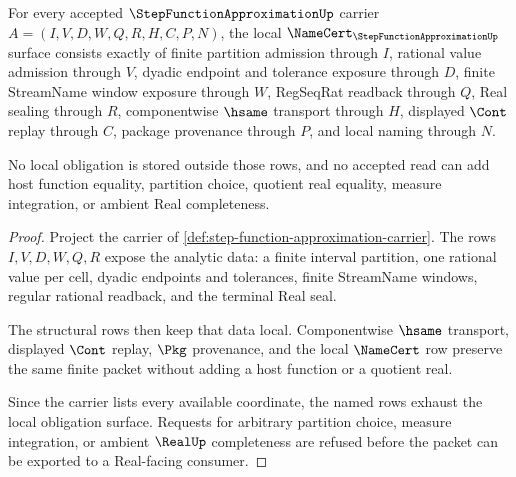 \begin{theorem}
\label{thm:step-function-approximation-namecert-obligations}
For every accepted $\StepFunctionApproximationUp$ carrier $A=(I,V,D,W,Q,R,H,C,P,N)$, the local $\NameCert_{\StepFunctionApproximationUp}$ surface consists exactly of finite partition admission through $I$, rational value admission through $V$, dyadic endpoint and tolerance exposure through $D$, finite StreamName window exposure through $W$, RegSeqRat readback through $Q$, Real sealing through $R$, componentwise $\hsame$ transport through $H$, displayed $\Cont$ replay through $C$, package provenance through $P$, and local naming through $N$.

No local obligation is stored outside those rows, and no accepted read can add host function equality, partition choice, quotient real equality, measure integration, or ambient Real completeness.
\end{theorem}
\begin{proof}
Project the carrier of \autoref{def:step-function-approximation-carrier}. The rows $I,V,D,W,Q,R$ expose the analytic data: a finite interval partition, one rational value per cell, dyadic endpoints and tolerances, finite StreamName windows, regular rational readback, and the terminal Real seal.

The structural rows then keep that data local. Componentwise $\hsame$ transport, displayed $\Cont$ replay, $\Pkg$ provenance, and the local $\NameCert$ row preserve the same finite packet without adding a host function or a quotient real.

Since the carrier lists every available coordinate, the named rows exhaust the local obligation surface. Requests for arbitrary partition choice, measure integration, or ambient $\RealUp$ completeness are refused before the packet can be exported to a Real-facing consumer.
\end{proof}

